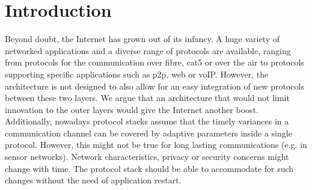 \documentclass{sig-alternate}
\newcommand{\ariane}[1]{\textcolor{green}{\emph{AK: #1}}}
\begin{document}



\section{Introduction}

Beyond doubt, the Internet has grown out of its infancy. A huge variety of networked applications and a diverse range of protocols are available, ranging from protocols for the communication over fibre, cat5 or over the air to protocols supporting specific applications such as p2p, web or voIP. However, the architecture is not designed to also allow for an easy integration of new protocols between these two layers. We argue that an architecture that would not limit innovation to the outer layers would give the Internet another boost.
Additionally, nowadays protocol stacks assume that the timely variances in a communication channel can be covered by adaptive parameters inside a single protocol. However, this might not be true for long lasting communications (e.g. in sensor networks). Network characteristics, privacy or security concerns might change with time. The protocol stack should be able to accommodate for such changes without the need of application restart. 
\end{document}

